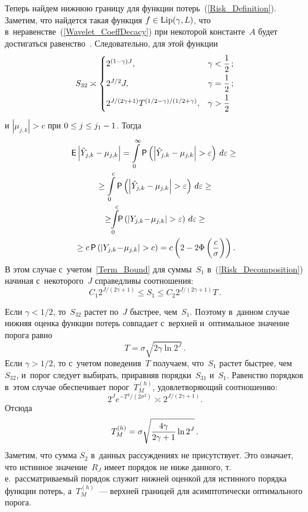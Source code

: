 \begin{multicols}{2}
Теперь найдем нижнюю границу для функции потерь~(\ref{Risk_Definition}). 
Заметим, что найдется такая функция $f\hm\in\mathrm{Lip}(\gamma,L)$, что 
в~неравенстве~(\ref{Wavelet_CoeffDecacy}) при некоторой константе~$A$ 
будет достигаться равенство~\cite{Mal99}. Следовательно, для этой функции
\begin{equation}
\label{S32_Order}
S_{32}\asymp 
\begin{cases}
2^{(1-\gamma)J}, & \gamma<\displaystyle\frac{\displaystyle 1\mathstrut}{\displaystyle 2\mathstrut}\,;\\
 2^{J/2}J, & \gamma=\displaystyle\frac{\displaystyle 1\mathstrut}{\displaystyle 2\mathstrut}\,;\\
 2^{{J}/({2\gamma+1})}T^{({1/2-\gamma})/({1/2+\gamma})}, & \gamma>\displaystyle\frac{\displaystyle 1\mathstrut}{\displaystyle 2\mathstrut}
 \end{cases}
\end{equation}
и $|\mu_{j,k}|>c$ при $0\hm\le j\hm\le j_1-1$. Тогда
\begin{multline*}
\e\left|\hat{Y}_{j,k}-\mu_{j,k}\right|=
\int\limits_0^\infty\p\left(\left|\hat{Y}_{j,k}-
\mu_{j,k}\right|>\varepsilon\right)\,d\varepsilon\ge{}\\
{}\ge
\int\limits_0^c\p\left(\left|\hat{Y}_{j,k}-\mu_{j,k}\right|>
\varepsilon\right)\,d\varepsilon\ge{}
\\
{}\ge\!\!\int\limits_0^c\!\! \p\left(\left|Y_{j,k}\!-\!\mu_{j,k}\right|>
\varepsilon\right)\,d\varepsilon\ge{}\\
{}\ge c\,\p\left(\left|{Y}_{j,k}\!-\!\mu_{j,k}\right|>{c}\right)
= c\left(2-2\Phi\left(\fr{c}{\sigma}\right)\right).
\end{multline*}
В этом случае с~учетом~\eqref{Term_Bound} для суммы~$S_1$ в~(\ref{Risk_Decomposition}) начиная с~некоторого~$J$ 
справедливы соотношения:
\begin{equation}
\label{S1_Order}
C_1 2^{{J}/({2\gamma+1})}\le S_1\le C_2 2^{J/({2\gamma+1})}T\,.
\end{equation}

Если $\gamma<1/2$, то~$S_{32}$ растет по~$J$ быст\-рее, чем~$S_1$. 
Поэтому в~данном случае ниж\-няя оценка функции потерь сов\-па\-да\-ет с~верх\-ней и~оптимальное
 значение порога равно
$$
T =\sigma\sqrt{2\gamma\ln2^J}\,.
$$
Если $\gamma>1/2$, то с~учетом поведения~$T$ получаем, что~$S_1$ растет быст\-рее, чем~$S_{32}$, и~порог 
следует выбирать, при\-рав\-няв порядки~$S_{31}$ и~$S_1$. Равенство порядков в~этом случае обеспечивает 
порог~$T_M^{(h)}$, удовле\-тво\-ря\-ющий соотношению:
\begin{equation*}
2^{J}e^{-{T^2}/({2\sigma^2})} \asymp 2^{{J}/({2\gamma+1})}.
\end{equation*}
Отсюда
$$
T_M^{(h)}=\sigma\sqrt{\displaystyle\frac{\displaystyle 4\gamma\mathstrut}{\displaystyle 2\gamma+1\mathstrut}\ln2^J}\,.
$$
Заметим, что сумма $S_2$ в~данных рассуждениях не присутствует. 
Это означает, что истинное значение~$R_J$ имеет порядок не ниже данного, т.\,е.\
 рас\-смат\-ри\-ва\-емый порядок служит ниж\-ней оценкой для истинного порядка функции потерь, а~$T_M^{(h)}$~--- 
 верхней границей для асимп\-то\-ти\-че\-ски оптимального порога.


\end{multicols}
